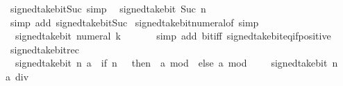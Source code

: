 \begin{isabellebody}
\ signed{\isacharunderscore}{\kern0pt}take{\isacharunderscore}{\kern0pt}bit{\isacharunderscore}{\kern0pt}Suc{\isacharunderscore}{\kern0pt}{}\ {\isacharbrackleft}{\kern0pt}simp{\isacharbrackright}{\kern0pt}{\isacharcolon}{\kern0pt}\isanewline
\ \ {\isacartoucheopen}signed{\isacharunderscore}{\kern0pt}take{\isacharunderscore}{\kern0pt}bit\ {\isacharparenleft}{\kern0pt}Suc\ n{\isacharparenright}{\kern0pt}\ {}\ {\isacharequal}{\kern0pt}\ {}{\isacartoucheclose}\isanewline
%
\isadelimproof
\ \ %
\endisadelimproof
%
\isatagproof
{}\isamarkupfalse%
\ {\isacharparenleft}{\kern0pt}simp\ add{\isacharcolon}{\kern0pt}\ signed{\isacharunderscore}{\kern0pt}take{\isacharunderscore}{\kern0pt}bit{\isacharunderscore}{\kern0pt}Suc{\isacharparenright}{\kern0pt}%
\endisatagproof
{\isafoldproof}%
%
\isadelimproof
\isanewline
%
\endisadelimproof
\isanewline
{}\isamarkupfalse%
\ signed{\isacharunderscore}{\kern0pt}take{\isacharunderscore}{\kern0pt}bit{\isacharunderscore}{\kern0pt}numeral{\isacharunderscore}{\kern0pt}of{\isacharunderscore}{\kern0pt}{}\ {\isacharbrackleft}{\kern0pt}simp{\isacharbrackright}{\kern0pt}{\isacharcolon}{\kern0pt}\isanewline
\ \ {\isacartoucheopen}signed{\isacharunderscore}{\kern0pt}take{\isacharunderscore}{\kern0pt}bit\ {\isacharparenleft}{\kern0pt}numeral\ k{\isacharparenright}{\kern0pt}\ {}\ {\isacharequal}{\kern0pt}\ {}{\isacartoucheclose}\isanewline
%
\isadelimproof
\ \ %
\endisadelimproof
%
\isatagproof
{}\isamarkupfalse%
\ {\isacharparenleft}{\kern0pt}simp\ add{\isacharcolon}{\kern0pt}\ bit{\isacharunderscore}{\kern0pt}{}{\isacharunderscore}{\kern0pt}iff\ signed{\isacharunderscore}{\kern0pt}take{\isacharunderscore}{\kern0pt}bit{\isacharunderscore}{\kern0pt}eq{\isacharunderscore}{\kern0pt}if{\isacharunderscore}{\kern0pt}positive{\isacharparenright}{\kern0pt}%
\endisatagproof
{\isafoldproof}%
%
\isadelimproof
\isanewline
%
\endisadelimproof
\isanewline
{}\isamarkupfalse%
\ signed{\isacharunderscore}{\kern0pt}take{\isacharunderscore}{\kern0pt}bit{\isacharunderscore}{\kern0pt}rec{\isacharcolon}{\kern0pt}\isanewline
\ \ {\isacartoucheopen}signed{\isacharunderscore}{\kern0pt}take{\isacharunderscore}{\kern0pt}bit\ n\ a\ {\isacharequal}{\kern0pt}\ {\isacharparenleft}{\kern0pt}if\ n\ {\isacharequal}{\kern0pt}\ {}\ then\ {\isacharminus}{\kern0pt}\ {\isacharparenleft}{\kern0pt}a\ mod\ {}{\isacharparenright}{\kern0pt}\ else\ a\ mod\ {}\ {\isacharplus}{\kern0pt}\ {}\ {\isacharasterisk}{\kern0pt}\ signed{\isacharunderscore}{\kern0pt}take{\isacharunderscore}{\kern0pt}bit\ {\isacharparenleft}{\kern0pt}n\ {\isacharminus}{\kern0pt}\ {}{\isacharparenright}{\kern0pt}\ {\isacharparenleft}{\kern0pt}a\ div\ {}{\isacharparenright}{\kern0pt}{\isacharparenright}{\kern0pt}{\isacartoucheclose}\isanewline

\end{isabellebody}
